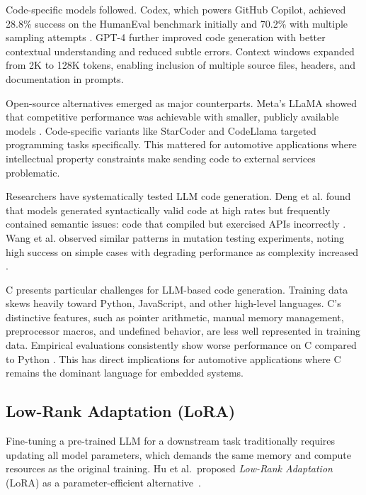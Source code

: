 Code-specific models followed. Codex, which powers GitHub Copilot, achieved 28.8\% success on the HumanEval benchmark initially and 70.2\% with multiple sampling attempts \cite{Chen2021}. GPT-4 further improved code generation with better contextual understanding and reduced subtle errors. Context windows expanded from 2K to 128K tokens, enabling inclusion of multiple source files, headers, and documentation in prompts.

Open-source alternatives emerged as major counterparts. Meta's LLaMA showed that competitive performance was achievable with smaller, publicly available models \cite{Touvron2023}. Code-specific variants like StarCoder and CodeLlama targeted programming tasks specifically. This mattered for automotive applications where intellectual property constraints make sending code to external services problematic.

Researchers have systematically tested LLM code generation. Deng et al. found that models generated syntactically valid code at high rates but frequently contained semantic issues: code that compiled but exercised APIs incorrectly \cite{TitanFuzz2022}. Wang et al. observed similar patterns in mutation testing experiments, noting high success on simple cases with degrading performance as complexity increased \cite{LLMMutationTesting2024}.

C presents particular challenges for LLM-based code generation. Training data skews heavily toward Python, JavaScript, and other high-level languages. C's distinctive features, such as pointer arithmetic, manual memory management, preprocessor macros, and undefined behavior, are less well represented in training data. Empirical evaluations consistently show worse performance on C compared to Python \cite{LLMDriverGenEffectiveness2023}. This has direct implications for automotive applications where C remains the dominant language for embedded systems.

\subsection{Low-Rank Adaptation (LoRA)}
\label{sec:lit_lora}

Fine-tuning a pre-trained LLM for a downstream task traditionally requires updating all model parameters, which demands the same memory and compute resources as the original training. Hu et al.\ proposed \emph{Low-Rank Adaptation} (LoRA) as a parameter-efficient alternative~\cite{Hu2021}.

